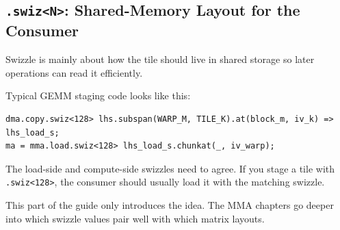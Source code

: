 \subsection*{\texttt{.\allowbreak{}swiz\textless{}N\textgreater{}}: Shared-Memory Layout for the Consumer}

Swizzle is mainly about how the tile should live in shared storage so later operations can read it efficiently.

Typical GEMM staging code looks like this:

\begin{lstlisting}[language=croqtile,caption={.swiz N : Shared-Memory Layout for the Consumer}]
dma.copy.swiz<128> lhs.subspan(WARP_M, TILE_K).at(block_m, iv_k) => lhs_load_s;
ma = mma.load.swiz<128> lhs_load_s.chunkat(_, iv_warp);
\end{lstlisting}

The load-side and compute-side swizzles need to agree. If you stage a tile with \texttt{.\allowbreak{}swiz\textless{}128\textgreater{}}, the consumer should usually load it with the matching swizzle.

This part of the guide only introduces the idea. The MMA chapters go deeper into which swizzle values pair well with which matrix layouts.
